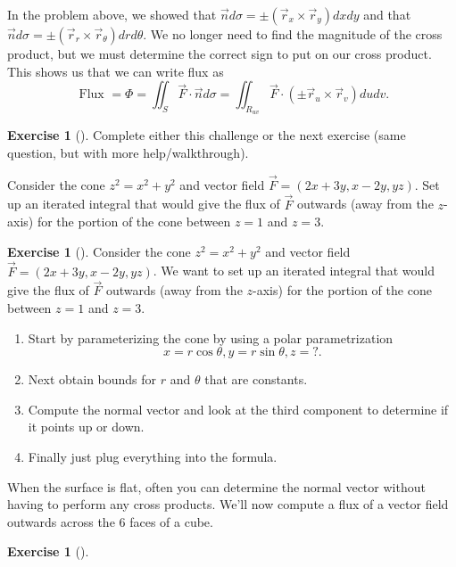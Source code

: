 \documentclass[10pt,]{book}
\theoremstyle{plain}
\theoremstyle{definition}
\theoremstyle{definition}
\theoremstyle{definition}
\theoremstyle{definition}
\newtheorem{exploration}[project]{Exercise}
\theoremstyle{definition}
\numberwithin{equation}{section}
\begin{document}
In the problem above, we showed that \(\vec n d\sigma = \pm(\vec r_x\times\vec r_y)dxdy\) and that \(\vec n d\sigma = \pm(\vec r_r\times\vec r_\theta)drd\theta\). We no longer need to find the magnitude of the cross product, but we must determine the correct sign to put on our cross product. This shows us that we can write flux as%
\begin{equation*}
\text{ Flux } =\Phi 
= \iint_S \vec F\cdot \vec n d\sigma 
= \iint_{R_{uv}} \vec F\cdot (\pm \vec r_u\times \vec r_v) dudv
.
\end{equation*}
%
\begin{exploration}[]\label{exploration-282}
Complete either this challenge or the next exercise (same question, but with more help/walkthrough).%
\par
Consider the cone \(z^2=x^2+y^2\) and vector field \(\vec F = (2x+3y, x-2y, yz)\). Set up an iterated integral that would give the flux of \(\vec F\) outwards (away from the \(z\)-axis) for the portion of the cone between \(z=1\) and \(z=3\).%
\end{exploration}
\begin{exploration}[]\label{exploration-283}
Consider the cone \(z^2=x^2+y^2\) and vector field \(\vec F = (2x+3y, x-2y, yz)\). We want to set up an iterated integral that would give the flux of \(\vec F\) outwards (away from the \(z\)-axis) for the portion of the cone between \(z=1\) and \(z=3\).%
\begin{enumerate}[font=\bfseries,label=(\alph*),ref=\alph*]
\item\label{task-780} Start by  parameterizing the cone by using a polar parametrization%
\begin{equation*}
x=r\cos\theta, y=r\sin\theta, z=?.
\end{equation*}
%
\item\label{task-781} Next obtain bounds for \(r\) and \(\theta\) that are constants.%
\item\label{task-782} Compute the normal vector and look at the third component to determine if it points up or down.%
\item\label{task-783} Finally just plug everything into the formula.%
\end{enumerate}
\end{exploration}
When the surface is flat, often you can determine the normal vector without having to perform any cross products. We'll now compute a flux of a vector field outwards across the 6 faces of a cube.%
\begin{exploration}[]\label{boxflux}
\end{exploration}
\typeout{************************************************}
\typeout{************************************************}
\end{document}
